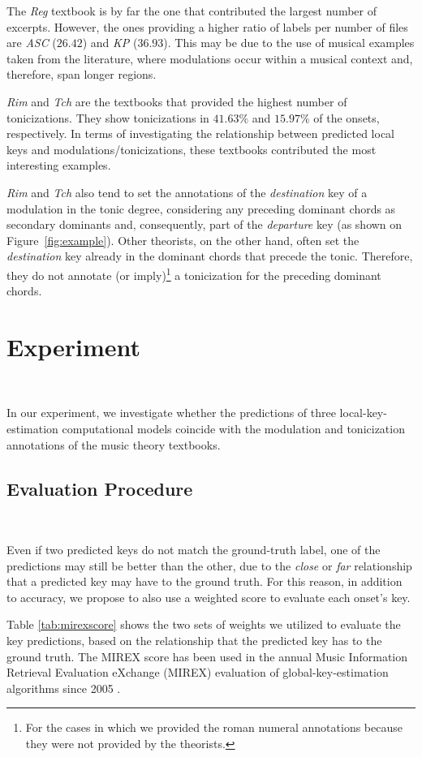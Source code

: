 \documentclass[sigconf]{acmart}
\begin{document}
The \emph{Reg} textbook is by far the one that contributed the largest number of excerpts. 
However, the ones providing a higher ratio of labels per number of files are \emph{ASC} ($26.42$) and \emph{KP} ($36.93$). 
This may be due to the use of musical examples taken from the literature, where modulations occur within a musical context and, therefore, span longer regions.

\emph{Rim} and \emph{Tch} are the textbooks that provided the highest number of tonicizations. 
They show tonicizations in $41.63\%$ and $15.97\%$ of the onsets, respectively. 
In terms of investigating the relationship between predicted local keys and modulations/tonicizations, these textbooks contributed the most interesting examples.

\emph{Rim} and \emph{Tch} also tend to set the annotations of the \emph{destination} key of a modulation in the tonic degree, considering any preceding dominant chords as secondary dominants and, consequently, part of the \emph{departure} key (as shown on Figure~\ref{fig:example}). 
Other theorists, on the other hand, often set the \emph{destination} key already in the dominant chords that precede the tonic. 
Therefore, they do not annotate (or imply)\footnote{For the cases in which we provided the roman numeral annotations because they were not provided by the theorists.} a tonicization for the preceding dominant chords. 

\section{Experiment}~\label{sec:exp}

In our experiment, we investigate whether the predictions of three local-key-estimation computational models coincide with the modulation and tonicization annotations of the music theory textbooks.

\subsection{Evaluation Procedure}~\label{sec:evaluations}

Even if two predicted keys do not match the ground-truth label, one of the predictions may still be better than the other, due to the \emph{close} or \emph{far} relationship that a predicted key may have to the ground truth. 
For this reason, in addition to accuracy, we propose to also use a weighted score to evaluate each onset's key.

Table \ref{tab:mirexscore} shows the two sets of weights we utilized to evaluate the key predictions, based on the relationship that the predicted key has to the ground truth. 
The MIREX score has been used in the annual Music Information Retrieval Evaluation eXchange (MIREX) evaluation of global-key-estimation algorithms since 2005 \cite{downie2005}.
\end{document}
